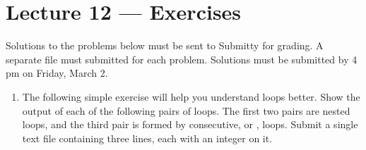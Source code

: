 \documentclass[letterpaper,10pt,english]{sphinxmanual}
\begin{document}
\chapter{Lecture 12 — Exercises}
\label{\detokenize{lecture_notes/lec12_loops2_exercises/exercises:lecture-12-exercises}}\label{\detokenize{lecture_notes/lec12_loops2_exercises/exercises::doc}}
Solutions to the problems below must be sent to Submitty for grading.
A separate file must submitted for each problem.  Solutions must be
submitted by 4 pm on Friday, March 2.
\begin{enumerate}
\item {} 
The following simple exercise will help you understand loops better.
Show the output of each of the following pairs of  loops. The
first two pairs are nested loops, and the third pair is formed by
consecutive, or , loops.  Submit a single text file
containing three lines, each with an integer on it.

%
\begin{sphinxVerbatim}[commandchars=\\\{\}]
  
   
       
          
\end{sphinxVerbatim}

%
\begin{sphinxVerbatim}[commandchars=\\\{\}]
  
   
       
          
\end{sphinxVerbatim}

%
\begin{sphinxVerbatim}[commandchars=\\\{\}]
  
   
      
   
      
\end{sphinxVerbatim}


\end{enumerate}
\end{document}
